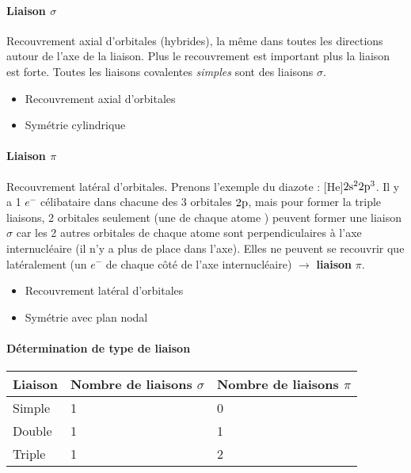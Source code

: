 \paragraph{Liaison $\sigma$}

Recouvrement axial d'orbitales (hybrides),
la même dans toutes les directions autour de l'axe de la liaison.
Plus le recouvrement est important plus la liaison est forte.
Toutes les liaisons covalentes {\it simples} sont des liaisons $\sigma$.

\begin{itemize}
  \item Recouvrement axial d'orbitales
  \item Symétrie cylindrique
\end{itemize}

\paragraph{Liaison $\pi$}

Recouvrement latéral d'orbitales.
Prenons l'exemple du diazote : [He]$2\mathrm{s}^2 2\mathrm{p}^3$.
Il y a 1 $e^-$ célibataire dans chacune des 3 orbitales $2\mathrm{p}$,
mais pour former la triple liaisons,
2 orbitales seulement (une de chaque atome ) peuvent former une liaison $\sigma$ car les 2 autres orbitales de chaque atome sont perpendiculaires à l'axe internucléaire (il n'y a plus de place dans l'axe).
Elles ne peuvent se recouvrir que latéralement (un $e^-$ de chaque côté de l'axe internucléaire) $\rightarrow$ \textbf{liaison} $\pi$.

\begin{itemize}
  \item Recouvrement latéral d'orbitales
  \item Symétrie avec plan nodal
\end{itemize}

\paragraph{Détermination de type de liaison}

\begin{center}
  \begin{tabular}{l|ll}
    Liaison & Nombre de liaisons $\sigma$ & Nombre de liaisons $\pi$\\
    \hline
    Simple & 1 & 0\\ %
    Double & 1 & 1\\
    Triple & 1 & 2\\
  \end{tabular}
\end{center}

